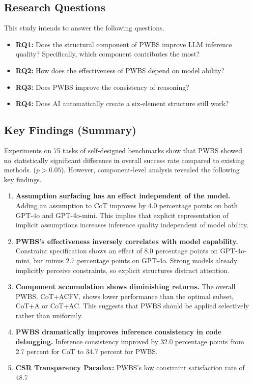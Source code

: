 \documentclass[11pt,a4paper]{article}
\begin{document}
\subsection{Research Questions}

This study intends to answer the following questions.

\begin{itemize}[leftmargin=2em]
  \item \textbf{RQ1:} Does the structural component of PWBS improve LLM inference quality? Specifically, which component contributes the most?
  \item \textbf{RQ2:} How does the effectiveness of PWBS depend on model ability?
  \item \textbf{RQ3:} Does PWBS improve the consistency of reasoning?
  \item \textbf{RQ4:} Does AI automatically create a six-element structure still work?
\end{itemize}

\subsection{Key Findings (Summary)}

Experiments on 75 tasks of self-designed benchmarks show that PWBS showed no statistically significant difference in overall success rate compared to existing methods. ($p > 0.05$). However, component-level analysis revealed the following key findings.

\begin{enumerate}[leftmargin=2em]
  \item \textbf{Assumption surfacing has an effect independent of the model.} Adding an assumption to CoT improves by 4.0 percentage points on both GPT-4o and GPT-4o-mini. This implies that explicit representation of implicit assumptions increases inference quality independent of model ability.

  \item \textbf{PWBS's effectiveness inversely correlates with model capability.} Constraint specification shows an effect of 8.0 percentage points on GPT-4o-mini, but minus 2.7 percentage points on GPT-4o. Strong models already implicitly perceive constraints, so explicit structures distract attention.

  \item \textbf{Component accumulation shows diminishing returns.} The overall PWBS, CoT+ACFV, shows lower performance than the optimal subset, CoT+A or CoT+AC. This suggests that PWBS should be applied selectively rather than uniformly.

  \item \textbf{PWBS dramatically improves inference consistency in code debugging.} Inference consistency improved by 32.0 percentage points from 2.7 percent for CoT to 34.7 percent for PWBS.

  \item \textbf{CSR Transparency Paradox:} PWBS's low constraint satisfaction rate of 48.7%
\end{enumerate}
\end{document}

